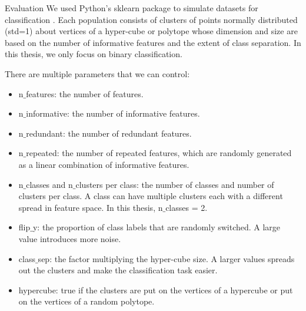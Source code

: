 \documentclass[12pt]{pom_thesis}
\begin{document}
\begin{chapter}{Evaluation}
We used Python's sklearn package to simulate datasets for classification \citep{sklearn}. Each population consists of clusters of points normally distributed (std=1) about vertices of a hyper-cube or polytope whose dimension and size are based on the number of informative features and the extent of class separation. In this thesis, we only focus on binary classification. 

There are multiple parameters that we can control:
\begin{itemize}
    \item n$\_$features: the number of features.
    \item n$\_$informative: the number of informative features.
    \item n$\_$redundant: the number of redundant features.
    \item n$\_$repeated: the number of repeated features, which are randomly generated as a linear combination of informative features.
    \item n$\_$classes and n$\_$clusters per class: the number of classes and number of clusters per class. A class can have multiple clusters each with a different spread in feature space. In this thesis, n$\_$classes = 2.
    
    \item flip$\_$y: the proportion of class labels that are randomly switched. A large value introduces more noise.
    \item class$\_$sep: the factor multiplying the hyper-cube size. A larger values spreads out the clusters and make the classification task easier.
    \item hypercube: true if the clusters are put on the vertices of a hypercube or put on the vertices of a random polytope.
\end{itemize}



\end{chapter}
\end{document}
